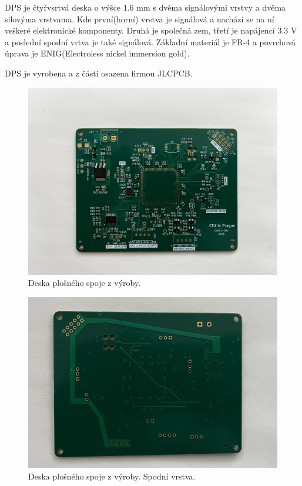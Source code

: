 DPS je čtyřvsrtvá deska o výšce 1.6 mm s dvěma signálovými vrstvy a dvěma silovýma vrstvama. Kde první(horní) vrstva je signálová a nachází se na ní veškeré elektronické komponenty. Druhá je společná zem, třetí je napájencí 3.3 V a poslední spodní vrtva je také signálová.
Základní materiál je FR-4 a povrchová úprava je ENIG(Electroless nickel immersion gold).
\par
DPS je vyrobena a z části osazena firmou JLCPCB.
\begin{figure}[H]
    \includegraphics[width=1\linewidth]{pictures/pcb_from_production.jpg}
    \caption{Deska plošného spoje z výroby.}
    \label{fig:pcb_production}
\end{figure}
\begin{figure}[H]
    \includegraphics[width=1\linewidth]{pictures/pcb_production_bottom.jpg}
    \caption{Deska plošného spoje z výroby. Spodní vrstva.}
    \label{fig:pcb_production_bottom}
\end{figure}

